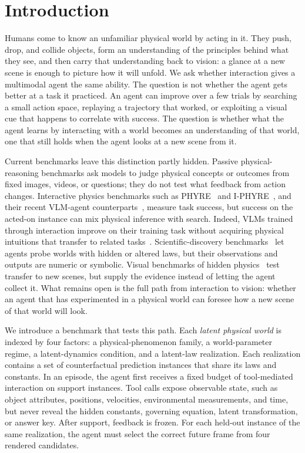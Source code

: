 \section{Introduction}
\label{sec:intro}

Humans come to know an unfamiliar physical world by acting in it. They push, drop, and collide objects, form an understanding of the principles behind what they see, and then carry that understanding back to vision: a glance at a new scene is enough to picture how it will unfold. We ask whether interaction gives a multimodal agent the same ability. The question is not whether the agent gets better at a task it practiced. An agent can improve over a few trials by searching a small action space, replaying a trajectory that worked, or exploiting a visual cue that happens to correlate with success. The question is whether what the agent learns by interacting with a world becomes an understanding of that world, one that still holds when the agent looks at a new scene from it.

Current benchmarks leave this distinction partly hidden. Passive physical-reasoning benchmarks ask models to judge physical concepts or outcomes from fixed images, videos, or questions; they do not test what feedback from action changes. Interactive physics benchmarks such as PHYRE~\cite{phyre} and I-PHYRE~\cite{iphyre}, and their recent VLM-agent counterparts~\cite{deepphy,ipr1}, measure task success, but success on the acted-on instance can mix physical inference with search. Indeed, VLMs trained through interaction improve on their training task without acquiring physical intuitions that transfer to related tasks~\cite{schulzebuschoff2026}. Scientific-discovery benchmarks~\cite{physgym,newtonbench,discoverphysics} let agents probe worlds with hidden or altered laws, but their observations and outputs are numeric or symbolic. Visual benchmarks of hidden physics~\cite{comphy,inphyre} test transfer to new scenes, but supply the evidence instead of letting the agent collect it. What remains open is the full path from interaction to vision: whether an agent that has experimented in a physical world can foresee how a new scene of that world will look.

We introduce a benchmark that tests this path. Each \emph{latent physical world} is indexed by four factors: a physical-phenomenon family, a world-parameter regime, a latent-dynamics condition, and a latent-law realization. Each realization contains a set of counterfactual prediction instances that share its laws and constants. In an episode, the agent first receives a fixed budget of tool-mediated interaction on support instances. Tool calls expose observable state, such as object attributes, positions, velocities, environmental measurements, and time, but never reveal the hidden constants, governing equation, latent transformation, or answer key. After support, feedback is frozen. For each held-out instance of the same realization, the agent must select the correct future frame from four rendered candidates.

